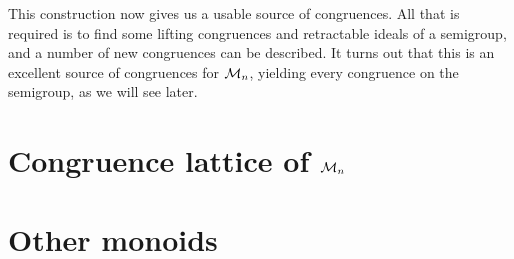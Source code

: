 This construction now gives us a usable source of congruences.  All that is
required is to find some lifting congruences and retractable ideals of a
semigroup, and a number of new congruences can be described.  It turns out that
this is an excellent source of congruences for $\mathcal{M}_n$, yielding every
congruence on the semigroup, as we will see later.

\section{Congruence lattice of $\mathcal{M}_n$}
\label{sec:motzkin-congs}


\section{Other monoids}
\label{sec:motzkin-other}
